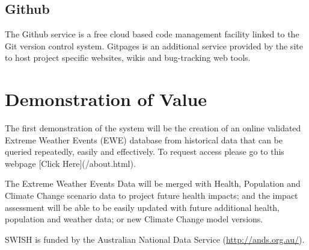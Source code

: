 \documentclass[a4paper]{article}
\begin{document}
\subsection{Github}
\label{sec-3-12}

The Github service is a free cloud based code management facility linked to the Git version control system.
Gitpages is an additional service provided by the site to host project specific websites, wikis and bug-tracking web tools.
\section{Demonstration of Value}
\label{sec-4}

The first demonstration of the system will be the creation of an online validated Extreme Weather Events (EWE) database from historical data that can be queried repeatedly, easily and effectively.  To request access please go to this webpage [Click Here](/about.html).

The Extreme Weather Events Data will be merged with Health, Population and Climate Change scenario data to project future health impacts; and the impact assessment will be able to be easily updated with future additional health, population and weather data; or new Climate Change model versions.  

SWISH is funded by the Australian National Data Service (\href{http://ands.org.au/}{http://ands.org.au/}).
\end{document}

